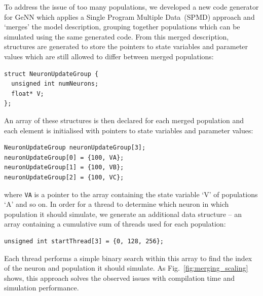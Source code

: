 \documentclass[9pt,a4paper]{amsart}
\begin{document}
To address the issue of too many populations, we developed a new code generator for GeNN which applies a Single Program Multiple Data~(SPMD) approach and `merges' the model description, grouping together populations which can be simulated using the same generated code.
From this merged description, structures are generated to store the pointers to state variables and parameter values which are still allowed to differ between merged populations:
%
\begin{lstlisting}
struct NeuronUpdateGroup {
  unsigned int numNeurons;
  float* V;
};
\end{lstlisting}
%
An array of these structures is then declared for each merged population and each element is initialised with pointers to state variables and parameter values:
%
\begin{lstlisting}
NeuronUpdateGroup neuronUpdateGroup[3];
neuronUpdateGroup[0] = {100, VA};
neuronUpdateGroup[1] = {100, VB};
neuronUpdateGroup[2] = {100, VC};
\end{lstlisting}
%
where \lstinline{VA} is a pointer to the array containing the state variable `V' of populations `A' and so on.
In order for a thread to determine which neuron in which population it should simulate, we generate an additional data structure -- an array containing a cumulative sum of threads used for each population:
\begin{lstlisting}
unsigned int startThread[3] = {0, 128, 256};
\end{lstlisting}
Each thread performs a simple binary search within this array to find the index of the neuron and population it should simulate.
As Fig.~\ref{fig:merging_scaling} shows, this approach solves the observed issues with compilation time and simulation performance.
%
\end{document}
